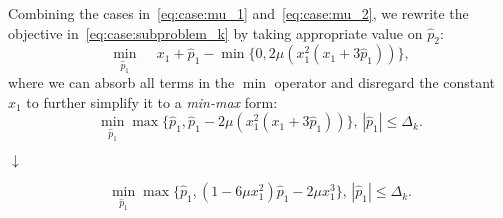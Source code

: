 Combining the cases in~\eqref{eq:case:mu_1} and~\eqref{eq:case:mu_2}, we rewrite the objective in~\eqref{eq:case:subproblem_k} by taking appropriate value on $\hat{p}_2$:
\begin{equation}
\label{eq:case:subproblem_k_min}
\min_{\hat{p}_1} \,  \quad x_1 + \hat{p}_1 - \min\{0,2\mu(x_1^2(x_1+3\hat{p}_1))\},
\end{equation}
where we can absorb all terms in the $\min$ operator and disregard the constant $x_1$ to further simplify it to a \textit{min-max} form:
\begin{equation}
\label{eq:case:subproblem_k_simplify1}
\min_{\hat{p}_1} \max\{\hat{p}_1,\hat{p}_1-2\mu(x_1^2(x_1+3\hat{p}_1))\},\,|\hat{p}_1|\leq \Delta_k.
\end{equation}
\begin{center}
$\downarrow$
\end{center}
\begin{equation}
\label{eq:case:subproblem_k_simplify2}
\min_{\hat{p}_1} \max\{\hat{p}_1,(1-6\mu x_1^2)\hat{p}_1-2\mu x_1^3\},\,|\hat{p}_1|\leq \Delta_k.
\end{equation}
